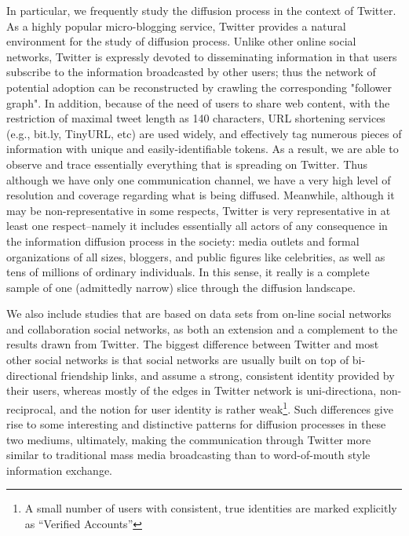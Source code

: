 \documentclass[phd,tocprelim]{cornell}
\begin{document}
In particular, we frequently study the diffusion process in the context of Twitter. As a highly popular micro-blogging service, Twitter provides a natural environment for the study of diffusion process. Unlike other online social networks, Twitter is expressly devoted to disseminating information in that users subscribe to the information broadcasted by other users; thus the network of potential adoption can be reconstructed by crawling the corresponding "follower graph". In addition, because of the need of users to share web content, with the restriction of maximal tweet length as 140 characters, URL shortening services (e.g., bit.ly, TinyURL, etc) are used widely, and effectively tag numerous pieces of information with unique and easily-identifiable tokens. As a result, we are able to observe and trace essentially everything that is spreading on Twitter. Thus although we have only one communication channel, we have a very high level of resolution and coverage regarding what is being diffused. Meanwhile, although it may be non-representative in some respects, Twitter is very representative in at least one respect--namely it includes essentially all actors of any consequence in the information diffusion process in the society: media outlets and formal organizations of all sizes, bloggers, and public figures like celebrities, as well as tens of millions of ordinary individuals. In this sense, it really is a complete sample of one (admittedly narrow) slice through the diffusion landscape. 

We also include studies that are based on data sets from on-line social networks and collaboration social networks, as both an extension and a complement to the results drawn from Twitter. The biggest difference between Twitter and most other social networks is that social networks are usually built on top of bi-directional friendship links, and assume a strong, consistent identity provided by their users, whereas mostly of the edges in Twitter network is uni-directiona, non-reciprocal, and the notion for user identity is rather weak\footnote{A small number of users with consistent, true identities are marked explicitly as ``Verified Accounts''}. Such differences give rise to some interesting and distinctive patterns for diffusion processes in these two mediums, ultimately, making the communication through Twitter more similar to traditional mass media broadcasting than to word-of-mouth style information exchange.

\end{document}
